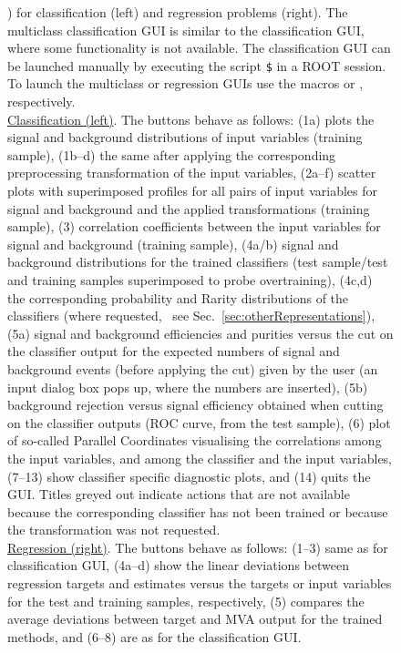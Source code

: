 \begin{figure}[p]
{              \pageref{pgr:scripttable1}) for classification (left) and regression 
              problems (right). The multiclass classification GUI is similar to the classification GUI,
              where some functionality is not available.
              The classification GUI can be launched manually by executing the script
              {\tt \$} in a ROOT 
              session. To launch the multiclass or regression GUIs use the macros 
              or , respectively. \\[0.2cm]
              {\footnotesize
              \underline{Classification (left)}. The buttons behave as follows:
              (1a) plots the signal and background 
              distributions of input variables (training sample), (1b--d) the 
              same after applying the corresponding preprocessing transformation of the input 
              variables, (2a--f) scatter plots with superimposed profiles for all 
              pairs of input variables for signal and background and the applied transformations
              (training sample), (3) correlation coefficients 
              between the input variables for signal and background (training sample), 
              (4a/b) signal and background distributions for the trained classifiers (test 
              sample/test and training samples superimposed to probe overtraining), 
              (4c,d) the corresponding probability and Rarity distributions of the classifiers
              (where requested, \cf\  see Sec.~\ref{sec:otherRepresentations}), 
              (5a) signal and background efficiencies and purities versus the cut on the classifier
              output for the expected numbers of signal and background events (before applying the cut) 
              given by the user (an input dialog box pops up, where the numbers are inserted),
              (5b) background rejection versus signal efficiency obtained when cutting 
              on the classifier outputs (ROC curve, from the test sample), (6) plot of so-called
              Parallel Coordinates visualising the correlations among the input variables, and 
              among the classifier and the input variables,  (7--13) show classifier 
              specific diagnostic plots, and (14) quits the GUI. Titles greyed out indicate 
              actions that are not available because the corresponding classifier has not 
              been trained or because the transformation was not requested.\\
              \underline{Regression (right)}. The buttons behave as follows:
              (1--3) same as for classification GUI, (4a--d) show the linear deviations between 
              regression targets and estimates versus the targets or input variables for the 
              test and training samples, respectively, (5) compares the average deviations 
              between target and MVA output for the trained methods, and (6--8) are as for the classification GUI.}
}
\label{fig:tmvagui}
\end{figure}


